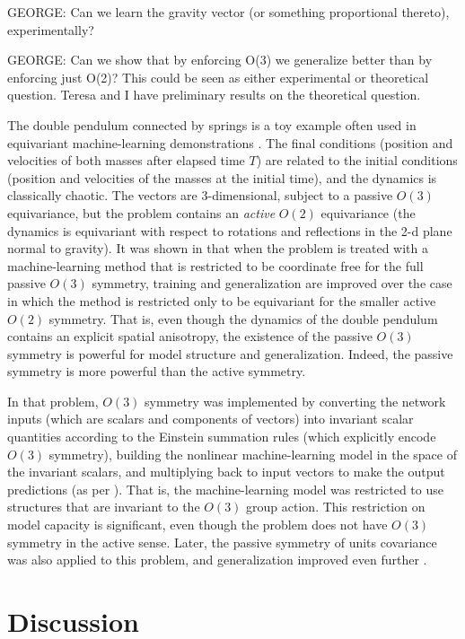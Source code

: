 \documentclass[11pt]{article}
\begin{document}
GEORGE: Can we learn the gravity vector (or something proportional thereto), experimentally?

GEORGE: Can we show that by enforcing O(3) we generalize better than by enforcing just O(2)? This could be seen as either experimental or theoretical question. Teresa and I have preliminary results on the theoretical question.

The double pendulum connected by springs is a toy example often used in equivariant machine-learning demonstrations \cite{finzi2021practical,yao2021simple}. 
The final conditions (position and velocities of both masses after elapsed time $T$) are related to the initial conditions (position and velocities of the masses at the initial time), and the dynamics is classically chaotic.
The vectors are 3-dimensional, subject to a passive $O(3)$ equivariance, but the problem contains an \emph{active} $O(2)$ equivariance (the dynamics is equivariant with respect to rotations and reflections in the 2-d plane normal to gravity).
It was shown in \cite{yao2021simple} that when the problem is treated with a machine-learning method that is restricted to be coordinate free for the full passive $O(3)$ symmetry, training and generalization are improved over the case in which the method is restricted only to be equivariant for the smaller active $O(2)$ symmetry.
That is, even though the dynamics of the double pendulum contains an explicit spatial anisotropy, the existence of the passive $O(3)$ symmetry is powerful for model structure and generalization.
Indeed, the passive symmetry is more powerful than the active symmetry.

In that problem, $O(3)$ symmetry was implemented by converting the network inputs (which are scalars and components of vectors) into invariant scalar quantities according to the Einstein summation rules (which explicitly encode $O(3)$ symmetry), building the nonlinear machine-learning model in the space of the invariant scalars, and multiplying back to input vectors to make the output predictions (as per \cite{villar2021scalars}).
That is, the machine-learning model was restricted to use structures that are invariant to the $O(3)$ group action.
This restriction on model capacity is significant, even though the problem does not have $O(3)$ symmetry in the active sense.
Later, the passive symmetry of units covariance was also applied to this problem, and generalization improved even further \cite{villar2022dimensionless}.

\section{Discussion}
\end{document}
